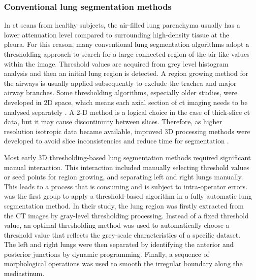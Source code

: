 \subsubsection{Conventional lung segmentation methods}
In \gls{ct} scans from healthy subjects, the air-filled lung parenchyma usually has a lower attenuation level compared to surrounding high-density tissue at the pleura. For this reason, many conventional lung segmentation algorithms adopt a thresholding approach to search for a large connected region of the air-like values within the image. Threshold values are acquired from grey level histogram analysis and then an initial lung region is detected. A region growing method for the airways is usually applied subsequently to exclude the trachea and major airway branches. Some thresholding algorithms, especially older studies, were developed in 2D space, which means each axial section of \gls{ct} imaging needs to be analysed separately \citep{kalender1991semiautomatic,kemerink1998segmentation,leader2003automated,armato2004automated}. A 2-D method is a logical choice in the case of thick-slice \gls{ct} data, but it may cause discontinuity between slices. Therefore, as higher resolution isotropic data became available, improved 3D processing methods were developed to avoid slice inconsistencies and reduce time for segmentation \citep{hu2001automatic,ukil2005smoothing,sun20063d}.

Most early 3D thresholding-based lung segmentation methods \citep{keller1981automatic,hedlund1982two,hoffman1983noninvasive,hoffman1985effecta,hoffman1985effectb} required significant manual interaction. This interaction included manually selecting threshold values or seed points for region growing, and separating left and right lungs manually. This leads to a process that is consuming and is subject to intra-operator errors. \cite{hu2001automatic} was the first group to apply a threshold-based algorithm in a fully automatic lung segmentation method. In their study, the lung region was firstly extracted from the CT images by gray-level thresholding processing. Instead of a fixed threshold value, an optimal thresholding method was used to automatically choose a threshold value that reflects the grey-scale characteristics of a specific dataset. The left and right lungs were then separated by identifying the anterior and posterior junctions by dynamic programming. Finally, a sequence of morphological operations was used to smooth the irregular boundary along the mediastinum.

